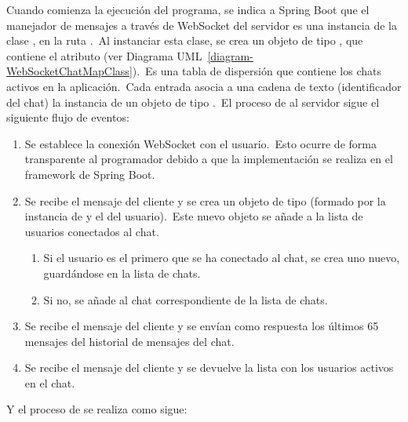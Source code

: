 
Cuando comienza la ejecución del programa, se indica a Spring Boot que el manejador de mensajes a través de WebSocket
del servidor es una instancia de la clase , en la ruta
.\ Al instanciar esta clase, se crea un objeto  de tipo
, que contiene el atributo
 (ver Diagrama UML~\ref{diagram-WebSocketChatMapClass}).\ Es una tabla de dispersión que contiene los
chats activos en la aplicación.\ Cada entrada asocia a una cadena de texto (identificador del chat) la instancia de
un objeto de tipo .\ El proceso de  al servidor sigue el siguiente flujo de eventos:

\begin{enumerate}
	\item Se establece la conexión WebSocket con el usuario.\ Esto ocurre de forma transparente al programador debido a
	que la implementación se realiza en el framework de Spring Boot.
	\item Se recibe el mensaje  del cliente y se crea un objeto de tipo 
	(formado por la instancia de  y el  del usuario).\ Este nuevo
	objeto se añade a la lista de usuarios conectados al chat.
	\begin{enumerate}
		\item Si el usuario es el primero que se ha conectado al chat, se crea uno nuevo, guardándose en la lista de
		chats.
		\item Si no, se añade al chat correspondiente de la lista de chats.
	\end{enumerate}
	\item Se recibe el mensaje  del cliente y se envían como respuesta los últimos 65
	mensajes del historial de mensajes del chat.
	\item Se recibe el mensaje  del cliente y se devuelve la lista con los usuarios
	activos en el chat.
\end{enumerate}
\label{itm:backend-connection-life-cycle}
Y el proceso de  se realiza como sigue:

